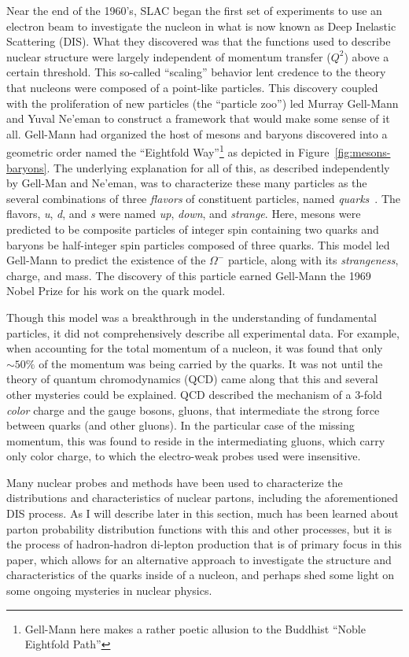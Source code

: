 Near the end of the 1960's, SLAC began the first set of experiments to use an electron beam to investigate the nucleon in what is now known as Deep Inelastic Scattering (DIS). What they discovered was that the functions used to describe nuclear structure were largely independent of momentum transfer ($Q^2$) above a certain threshold. This so-called ``scaling'' behavior lent credence to the theory that nucleons were composed of a point-like particles. This discovery coupled with the proliferation of new particles (the ``particle zoo'') led Murray Gell-Mann and Yuval Ne'eman to construct a framework that would make some sense of it all. Gell-Mann had organized the host of mesons and baryons discovered into a geometric order named the ``Eightfold Way''\footnote{Gell-Mann here makes a rather poetic allusion to the Buddhist ``Noble Eightfold Path''} as depicted in Figure~\ref{fig:mesons-baryons}. The underlying explanation for all of this, as described independently by Gell-Man and Ne'eman, was to characterize these many particles as the several combinations of three \emph{flavors} of constituent particles, named \emph{quarks}~\cite{joyce1999finnegans}. The flavors, \emph{u}, \emph{d}, and \emph{s} were named \emph{up}, \emph{down}, and \emph{strange}. Here, mesons were predicted to be composite particles of integer spin containing two quarks and baryons be half-integer spin particles composed of three quarks. This model led Gell-Mann to predict the existence of the $\Omega^-$ particle, along with its \emph{strangeness}, charge, and mass. The discovery of this particle\cite{1964PhRvL:12204B} earned Gell-Mann the 1969 Nobel Prize for his work on the quark model.

Though this model was a breakthrough in the understanding of fundamental particles, it did not comprehensively describe all experimental data. For example, when accounting for the total momentum of a nucleon, it was found that only $\sim50\%$ of the momentum was being carried by the quarks. It was not until the theory of quantum chromodynamics (QCD) came along that this and several other mysteries could be explained. QCD described the mechanism of a 3-fold \emph{color} charge and the gauge bosons, gluons, that intermediate the strong force between quarks (and other gluons). In the particular case of the missing momentum, this was found to reside in the intermediating gluons\cite{PhysRevLett.43.830}, which carry only color charge, to which the electro-weak probes used were insensitive.

Many nuclear probes and methods have been used to characterize the distributions and characteristics of nuclear partons, including the aforementioned DIS process. As I will describe later in this section, much has been learned about parton probability distribution functions with this and other processes, but it is the process of hadron-hadron di-lepton production that is of primary focus in this paper, which allows for an alternative approach to investigate the structure and characteristics of the quarks inside of a nucleon, and perhaps shed some light on some ongoing mysteries in nuclear physics.

